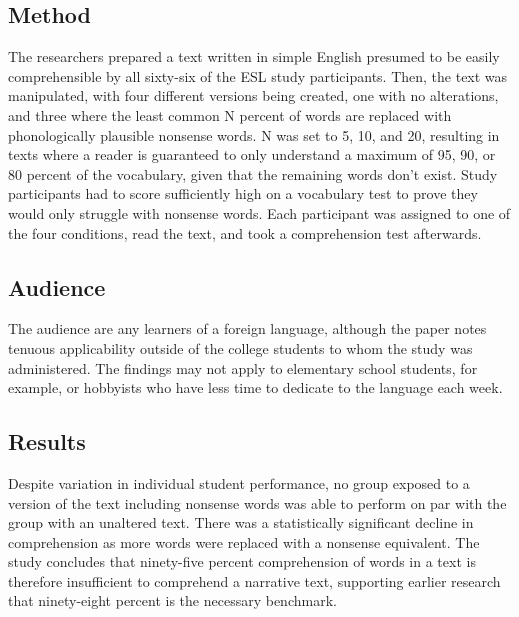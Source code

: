 \documentclass[
	letterpaper, %
]{jdf}
\begin{document}
\subsection{Method}
The researchers prepared a text written in simple English presumed to be easily comprehensible by all sixty-six of the ESL study participants. Then, the text was manipulated, with four different versions being created, one with no alterations, and three where the least common N percent of words are replaced with phonologically plausible nonsense words. N was set to 5, 10, and 20, resulting in texts where a reader is guaranteed to only understand a maximum of 95, 90, or 80 percent of the vocabulary, given that the remaining words don't exist. Study participants had to score sufficiently high on a vocabulary test to prove they would only struggle with nonsense words. Each participant was assigned to one of the four conditions, read the text, and took a comprehension test afterwards.

\subsection{Audience}
The audience are any learners of a foreign language, although the paper notes tenuous applicability outside of the college students to whom the study was administered. The findings may not apply to elementary school students, for example, or hobbyists who have less time to dedicate to the language each week.

\subsection{Results}
Despite variation in individual student performance, no group exposed to a version of the text including nonsense words was able to perform on par with the group with an unaltered text. There was a statistically significant decline in comprehension as more words were replaced with a nonsense equivalent. The study concludes that ninety-five percent comprehension of words in a text is therefore insufficient to comprehend a narrative text, supporting earlier research that ninety-eight percent is the necessary benchmark.
\end{document}
